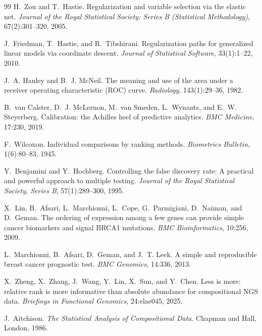 \documentclass[preprint,12pt,a4paper]{elsarticle}
\begin{document}
\begin{thebibliography}{99}
H.~Zou and T.~Hastie.
\newblock Regularization and variable selection via the elastic net.
\newblock \emph{Journal of the Royal Statistical Society: Series B (Statistical Methodology)}, 67(2):301--320, 2005.

J.~Friedman, T.~Hastie, and R.~Tibshirani.
\newblock Regularization paths for generalized linear models via coordinate descent.
\newblock \emph{Journal of Statistical Software}, 33(1):1--22, 2010.

J.~A. Hanley and B.~J. McNeil.
\newblock The meaning and use of the area under a receiver operating characteristic (ROC) curve.
\newblock \emph{Radiology}, 143(1):29--36, 1982.

B.~van Calster, D.~J. McLernon, M.~van Smeden, L.~Wynants, and E.~W. Steyerberg.
\newblock Calibration: the Achilles heel of predictive analytics.
\newblock \emph{BMC Medicine}, 17:230, 2019.

F.~Wilcoxon.
\newblock Individual comparisons by ranking methods.
\newblock \emph{Biometrics Bulletin}, 1(6):80--83, 1945.

Y.~Benjamini and Y.~Hochberg.
\newblock Controlling the false discovery rate: A practical and powerful approach to multiple testing.
\newblock \emph{Journal of the Royal Statistical Society, Series B}, 57(1):289--300, 1995.

X.~Lin, B.~Afsari, L.~Marchionni, L.~Cope, G.~Parmigiani, D.~Naiman, and D.~Geman.
\newblock The ordering of expression among a few genes can provide simple cancer biomarkers and signal BRCA1 mutations.
\newblock \emph{BMC Bioinformatics}, 10:256, 2009.

L.~Marchionni, B.~Afsari, D.~Geman, and J.~T. Leek.
\newblock A simple and reproducible breast cancer prognostic test.
\newblock \emph{BMC Genomics}, 14:336, 2013.

X.~Zheng, X.~Zhang, J.~Wang, Y.~Lin, X.~Sun, and Y.~Chen.
\newblock Less is more: relative rank is more informative than absolute abundance for compositional NGS data.
\newblock \emph{Briefings in Functional Genomics}, 24:elae045, 2025.

J.~Aitchison.
\newblock \emph{The Statistical Analysis of Compositional Data}.
\newblock Chapman and Hall, London, 1986.

\end{thebibliography}
\end{document}
